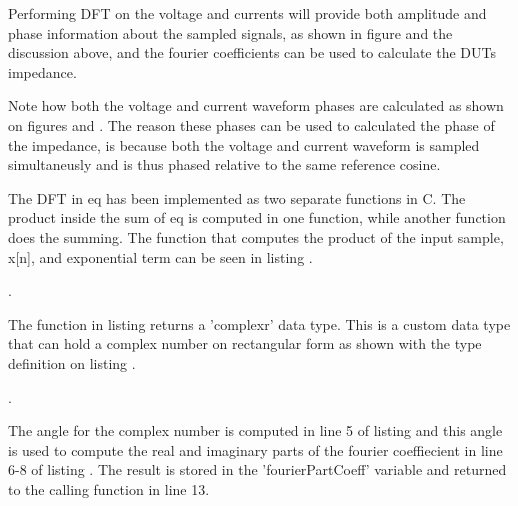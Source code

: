 Performing DFT on the voltage and currents will provide both amplitude and phase information about the sampled signals, as shown in figure  and the discussion above, and the fourier coefficients can be used to calculate the DUTs impedance.

Note how both the voltage and current waveform phases are calculated as shown on figures  and . The reason these phases can be used to calculated the phase of the impedance, is because both the voltage and current waveform is sampled simultaneusly and is thus phased relative to the same reference cosine.

The DFT in eq  has been implemented as two separate functions in C. The product inside the sum of eq  is computed in one function, while another function does the summing. The function that computes the product of the input sample, x[n], and exponential term can be seen in listing .

. 

The function in listing  returns a 'complexr' data type. This is a custom data type that can hold a complex number on rectangular form as shown with the type definition on listing .

. 

The angle for the complex number is computed in line 5 of listing  and this angle is used to compute the real and imaginary parts of the fourier coeffiecient in line 6-8 of listing . The result is stored in the 'fourierPartCoeff' variable and returned to the calling function in line 13.

